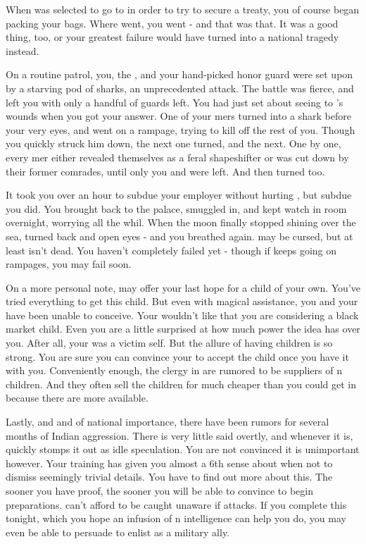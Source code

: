 \documentclass[char]{NeptuneBall}
\begin{document}
When \cPrince{} was selected to go to \pAtlantis{} in order to try to secure a treaty, you of course began packing your bags. Where \cPrince{\they} went, you went - and that was that. It was a good thing, too, or your greatest failure would have turned into a national tragedy instead.

On a routine patrol, you, the \cPrince{\prince}, and your hand-picked honor guard were set upon by a starving pod of sharks, an unprecedented attack. The battle was fierce, and left you with only a handful of guards left. You had just set about seeing to \cPrince{}'s wounds when you got your answer. One of your mers turned into a shark before your very eyes, and went on a rampage, trying to kill off the rest of you. Though you quickly struck him down, the next one turned, and the next. One by one, every mer either revealed themselves as a feral shapeshifter or was cut down by their former comrades, until only you and \cPrince{} were left. And then \cPrince{\they} turned too.

It took you over an hour to subdue your employer without hurting \cPrince{\them}, but subdue you did. You brought \cPrince{\them} back to the palace, smuggled \cPrince{\them} in, and kept watch in \cPrince{\their} room overnight, worrying all the whil. When the moon finally stopped shining over the sea, \cPrince{\they} turned back and open \cPrince{\their} eyes - and you breathed again. \cPrince{} may be cursed, but at least \cPrince{\they} isn't dead. You haven't completely failed yet - though if \cPrince{} keeps going on rampages, you may fail soon.

On a more personal note, \pAtlantis{} may offer your last hope for a child of your own.  You've tried everything to get this child. But even with magical assistance, you and your \cVHusband{\spouse} have been unable to conceive. Your \cVHusband{\spouse} wouldn't like that you are considering a black market child. Even you are a little surprised at how much power the idea has over you. After all, your \cSpy{\sibling} was a victim \cSpy{\them}self. But the allure of having children is so strong.  You are sure you can convince your \cVHusband{\spouse} to accept the child once you have it with you.  Conveniently enough, the clergy in \pAtlantis{} are rumored to be suppliers of \pAtlantis{}n children. And they often sell the children for much cheaper than you could get in \pPacifica{} because there are more available.

Lastly, and and of national importance, there have been rumors for several months of Indian aggression. There is very little said overtly, and whenever it is, \cPrince{} quickly stomps it out as idle speculation. You are not convinced it is unimportant however. Your training has given you almost a 6th sense about when not to dismiss seemingly trivial details.  You have to find out more about this. The sooner you have proof, the sooner you will be able to convince \cPrince{} to begin preparations. \pPacifica{} can't afford to be caught unaware if \pIndia{} attacks.  If you complete this tonight, which you hope an infusion of \pAtlantis{}n intelligence can help you do, you may even be able to persuade \cPrince{} to enlist \pAtlantis{} as a military ally.
\end{document}
